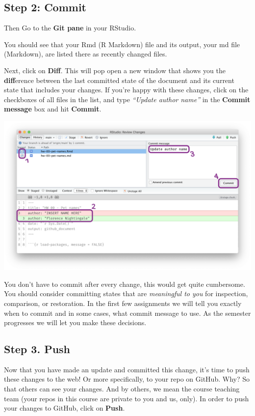 \documentclass[
]{article}
\begin{document}
\subsection{Step 2: Commit}\label{step-2-commit}

Then Go to the \textbf{Git pane} in your RStudio.

You should see that your Rmd (R Markdown) file and its output, your md
file (Markdown), are listed there as recently changed files.

Next, click on \textbf{Diff}. This will pop open a new window that shows
you the \textbf{diff}erence between the last committed state of the
document and its current state that includes your changes. If you're
happy with these changes, click on the checkboxes of all files in the
list, and type \emph{``Update author name''} in the \textbf{Commit
message} box and hit \textbf{Commit}.

\begin{flushleft}\includegraphics[width=0.8\linewidth]{img/update-author-name-commit} \end{flushleft}

You don't have to commit after every change, this would get quite
cumbersome. You should consider committing states that are
\emph{meaningful to you} for inspection, comparison, or restoration. In
the first few assignments we will tell you exactly when to commit and in
some cases, what commit message to use. As the semester progresses we
will let you make these decisions.

\subsection{Step 3. Push}\label{step-3.-push}

Now that you have made an update and committed this change, it's time to
push these changes to the web! Or more specifically, to your repo on
GitHub. Why? So that others can see your changes. And by others, we mean
the course teaching team (your repos in this course are private to you
and us, only). In order to push your changes to GitHub, click on
\textbf{Push}.
\end{document}
